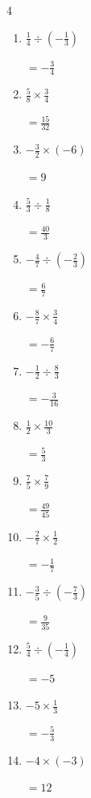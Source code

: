 \begin{multicols}{4}
\begin{enumerate}
        $\displaystyle =\frac{8}{7}$

  \item $\displaystyle \frac{1}{4}\div{}\left(-\frac{1}{3}\right)$

        $\displaystyle =-\frac{3}{4}$

  \item $\displaystyle \frac{5}{8}\times{}\frac{3}{4}$

        $\displaystyle =\frac{15}{32}$

  \item $\displaystyle -\frac{3}{2}\times{}\left(-6\right)$

        $\displaystyle =9$

  \item $\displaystyle \frac{5}{3}\div{}\frac{1}{8}$

        $\displaystyle =\frac{40}{3}$

\columnbreak %

  \item $\displaystyle -\frac{4}{7}\div{}\left(-\frac{2}{3}\right)$

        $\displaystyle =\frac{6}{7}$

  \item $\displaystyle -\frac{8}{7}\times{}\frac{3}{4}$

        $\displaystyle =-\frac{6}{7}$

  \item $\displaystyle -\frac{1}{2}\div{}\frac{8}{3}$

        $\displaystyle =-\frac{3}{16}$

  \item $\displaystyle \frac{1}{2}\times{}\frac{10}{3}$

        $\displaystyle =\frac{5}{3}$

  \item $\displaystyle \frac{7}{5}\times{}\frac{7}{9}$

        $\displaystyle =\frac{49}{45}$

  \item $\displaystyle -\frac{2}{7}\times{}\frac{1}{2}$

        $\displaystyle =-\frac{1}{7}$

  \item $\displaystyle -\frac{3}{5}\div{}\left(-\frac{7}{3}\right)$

        $\displaystyle =\frac{9}{35}$

  \item $\displaystyle \frac{5}{4}\div{}\left(-\frac{1}{4}\right)$

        $\displaystyle =-5$

  \item $\displaystyle -5\times{}\frac{1}{3}$

        $\displaystyle =-\frac{5}{3}$

  \item $\displaystyle -4\times{}\left(-3\right)$

        $\displaystyle =12$

\end{enumerate}
\end{multicols}
